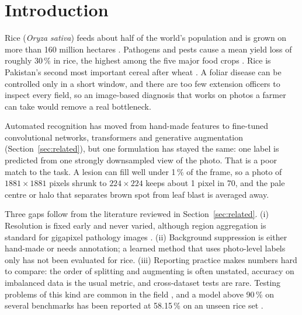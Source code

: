 \section{Introduction}
\label{sec:intro}

Rice (\textit{Oryza sativa}) feeds about half of the world's population and is grown on more than 160 million
hectares \cite{faostat2024}. Pathogens and pests cause a mean yield loss of roughly 30\,\% in rice, the highest among
the five major food crops \cite{savary2019}. Rice is Pakistan's second most important cereal after wheat
\cite{gopk2024}. A foliar disease can be controlled only in a short window, and there are too few extension officers
to inspect every field, so an image-based diagnosis that works on photos a farmer can take would remove a real
bottleneck.

Automated recognition has moved from hand-made features to fine-tuned convolutional networks, transformers and generative
augmentation (Section~\ref{sec:related}), but one formulation has stayed the same: one label is predicted from one strongly
downsampled view of the photo. That is a poor match to the task. A lesion can fill well under 1\,\% of the frame, so a
photo of $1881\times1881$ pixels \cite{do2019} shrunk to $224\times224$ keeps about 1 pixel in 70, and the pale centre or
halo that separates brown spot from leaf blast is averaged away.

Three gaps follow from the literature reviewed in Section~\ref{sec:related}.
(i) Resolution is fixed early and never varied, although region aggregation is standard for gigapixel pathology images
\cite{ilse2018, lu2021clam}. (ii) Background suppression is either hand-made or needs annotation; a learned method that
uses photo-level labels only has not been evaluated for rice. (iii) Reporting practice makes numbers hard to compare:
the order of splitting and augmenting is often unstated, accuracy on imbalanced data is the usual metric, and
cross-dataset tests are rare. Testing problems of this kind are common in the field \cite{xu2024}, and a model above
90\,\% on several benchmarks has been reported at 58.15\,\% on an unseen rice set \cite{thakur2023}.

